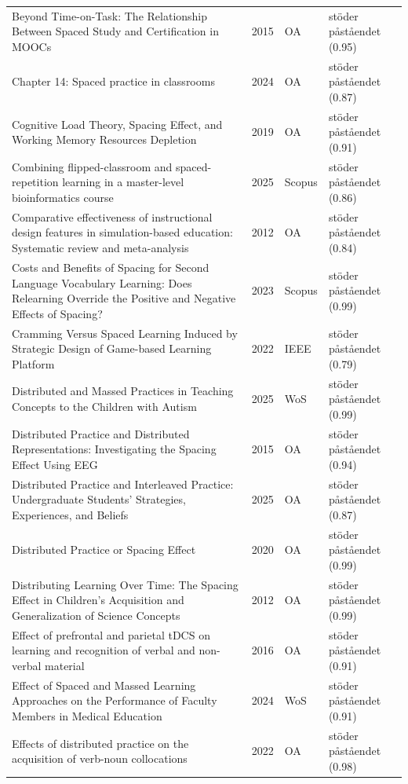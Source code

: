 \begin{longtable}{@{}%
  >{\raggedright\arraybackslash}p{}c%
  >{\raggedright\arraybackslash}p{}%
  >{\raggedright\arraybackslash}p{}@{}}
Beyond Time-on-Task: The Relationship Between Spaced Study and Certification in MOOCs & 2015 & OA & stöder påståendet (0.95) \\
Chapter 14: Spaced practice in classrooms & 2024 & OA & stöder påståendet (0.87) \\
Cognitive Load Theory, Spacing Effect, and Working Memory Resources Depletion & 2019 & OA & stöder påståendet (0.91) \\
Combining flipped-classroom and spaced-repetition learning in a master-level bioinformatics course & 2025 & Scopus & stöder påståendet (0.86) \\
Comparative effectiveness of instructional design features in simulation-based education: Systematic review and meta-analysis & 2012 & OA & stöder påståendet (0.84) \\
Costs and Benefits of Spacing for Second Language Vocabulary Learning: Does Relearning Override the Positive and Negative Effects of Spacing? & 2023 & Scopus & stöder påståendet (0.99) \\
Cramming Versus Spaced Learning Induced by Strategic Design of Game-based Learning Platform & 2022 & IEEE & stöder påståendet (0.79) \\
Distributed and Massed Practices in Teaching Concepts to the Children with Autism & 2025 & WoS & stöder påståendet (0.99) \\
Distributed Practice and Distributed Representations: Investigating the Spacing Effect Using EEG & 2015 & OA & stöder påståendet (0.94) \\
Distributed Practice and Interleaved Practice: Undergraduate Students' Strategies, Experiences, and Beliefs & 2025 & OA & stöder påståendet (0.87) \\
Distributed Practice or Spacing Effect & 2020 & OA & stöder påståendet (0.99) \\
Distributing Learning Over Time: The Spacing Effect in Children's Acquisition and Generalization of Science Concepts & 2012 & OA & stöder påståendet (0.99) \\
Effect of prefrontal and parietal tDCS on learning and recognition of verbal and non-verbal material & 2016 & OA & stöder påståendet (0.91) \\
Effect of Spaced and Massed Learning Approaches on the Performance of Faculty Members in Medical Education & 2024 & WoS & stöder påståendet (0.91) \\
Effects of distributed practice on the acquisition of verb-noun collocations & 2022 & OA & stöder påståendet (0.98) \\

\end{longtable}
